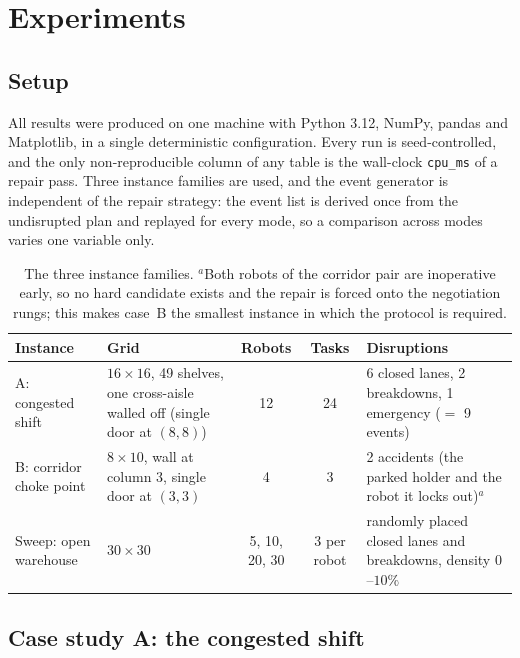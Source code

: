 \documentclass[10pt,a4paper]{article}
\newcommand{\code}[1]{\texttt{#1}}
\begin{document}
\section{Experiments}\label{sec:experiments}

\subsection{Setup}

All results were produced on one machine with Python 3.12, NumPy, pandas and
Matplotlib, in a single deterministic configuration.  Every run is
seed-controlled, and the only non-reproducible column of any table is the
wall-clock \code{cpu\_ms} of a repair pass.  Three instance families are
used, and the event generator is independent of the repair strategy: the
event list is derived once from the undisrupted plan and replayed for every
mode, so a comparison across modes varies one variable only.

\begin{table}[H]
\centering
\small
\begin{tabularx}{\textwidth}{@{}l X c c X@{}}
\toprule
\textbf{Instance} & \textbf{Grid} & \textbf{Robots} & \textbf{Tasks} & \textbf{Disruptions}\\
\midrule
A: congested shift & $16\times16$, 49 shelves, one cross-aisle walled off
  (single door at $(8,8)$) & 12 & 24 & 6 closed lanes, 2 breakdowns,
  1 emergency ($=$ 9 events)\\
B: corridor choke point & $8\times10$, wall at column 3, single door at
  $(3,3)$ & 4 & 3 & 2 accidents (the parked holder and the robot it locks
  out)$^{a}$\\
Sweep: open warehouse & $30\times30$ & 5, 10, 20, 30 & 3 per robot &
  randomly placed closed lanes and breakdowns, density $0$--$10\%$\\
\bottomrule
\end{tabularx}
\caption{The three instance families.  $^{a}$Both robots of the corridor pair
are inoperative early, so no hard candidate exists and the repair is forced
onto the negotiation rungs; this makes case~B the smallest instance in which
the protocol is required.}
\label{tab:instances}
\end{table}

\subsection{Case study A: the congested shift}\label{sec:caseA}
\end{document}
